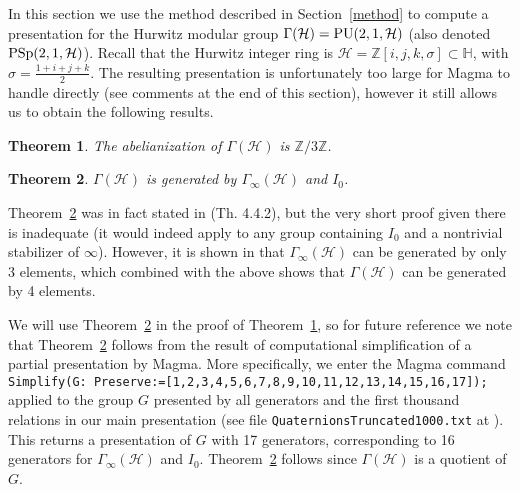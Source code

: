 \documentclass{article}[12pt]
\newcommand{\Z}{\mathbb{Z}}
\newcommand{\quat}{\mathbb{H}}
\newtheorem{thm}{Theorem}%
\begin{document}
In this section we use the method described in Section~\ref{method} to compute a presentation for the Hurwitz modular group $\Gamma(\mathcal{H})={\rm PU}(2,1,\mathcal{H})$ (also denoted  ${\rm PSp}(2,1,\mathcal{H})$).
Recall that the Hurwitz integer ring is $\mathcal{H}=\Z[i,j,k,\sigma] \subset \quat$, with $\sigma=\frac{1+i+j+k}{2}$. The resulting presentation is unfortunately too large for Magma to handle directly (see comments at the end of this section), however it still allows us to obtain the following results. 

\begin{thm}\label{hurwitzabel} The abelianization of $\Gamma(\mathcal{H})$ is $\Z/3\Z$.
\end{thm}

\begin{thm}\label{hurwitzgens} $\Gamma(\mathcal{H})$ is generated by $\Gamma_\infty(\mathcal{H})$ and $I_0$.
\end{thm}

Theorem~\ref{hurwitzgens} was in fact stated in \cite{Ph} (Th. 4.4.2), but the very short proof given there is inadequate (it would indeed apply to any group containing $I_0$ and a nontrivial stabilizer of $\infty$). However, it is shown in \cite{Ph} that  $\Gamma_\infty(\mathcal{H})$ can be generated by only 3 elements, which combined with the above shows that $\Gamma(\mathcal{H})$ can be generated by 4 elements. 

We will use Theorem~\ref{hurwitzgens} in the proof of Theorem~\ref{hurwitzabel}, so for future reference we note that  
Theorem~\ref{hurwitzgens} follows from the result of computational simplification of a partial presentation by Magma. More specifically, we enter the Magma command {\tt Simplify(G: Preserve:=[1,2,3,4,5,6,7,8,9,10,11,12,13,14,15,16,17]);} applied to the group $G$ presented by all generators and the first thousand relations in our main presentation (see file {\tt QuaternionsTruncated1000.txt} at \cite{MCode}). This returns a presentation of $G$ with 17 generators, corresponding to 16 generators for $\Gamma_\infty(\mathcal{H})$ and $I_0$. Theorem~\ref{hurwitzgens} follows since $\Gamma(\mathcal{H})$ is a quotient of $G$.

\vspace{.2cm}
\end{document}
